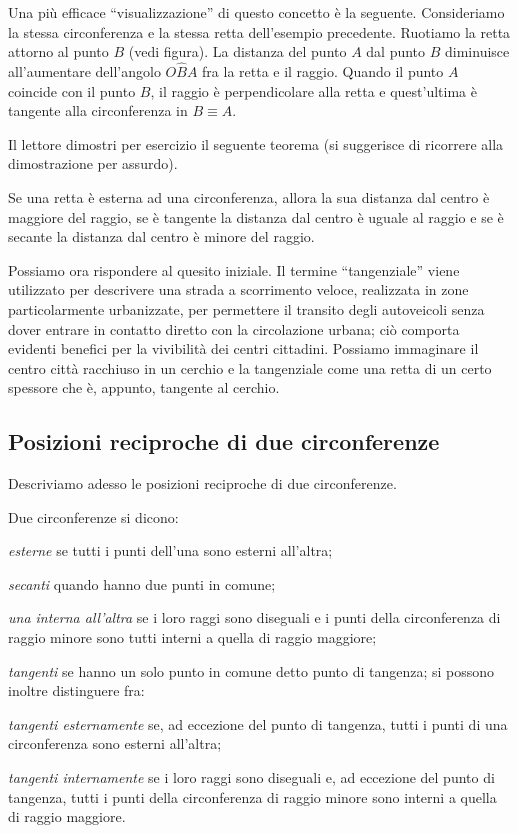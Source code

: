 Una più efficace ``visualizzazione'' di questo concetto è la seguente.
Consideriamo la stessa circonferenza e la stessa retta dell'esempio precedente. Ruotiamo la retta attorno al punto $B$ (vedi figura).
La distanza del punto $A$ dal punto $B$ diminuisce all'aumentare dell'angolo $O\widehat{B}A$ fra la retta e il raggio. Quando il punto $A$ coincide con il punto $B$, il raggio è perpendicolare alla retta e quest'ultima è tangente alla circonferenza in $B\equiv A$.

Il lettore dimostri per esercizio il seguente teorema (si suggerisce di ricorrere alla dimostrazione per assurdo).
\begin{teorema}
Se una retta è esterna ad una circonferenza, allora la sua distanza dal centro è maggiore del raggio, se è tangente la distanza dal centro è uguale al raggio e se è secante la distanza dal centro è minore del raggio.
\end{teorema}

Possiamo ora rispondere al quesito iniziale. Il termine ``tangenziale'' viene utilizzato per descrivere una strada a scorrimento veloce, realizzata in zone particolarmente urbanizzate, per permettere il transito degli autoveicoli senza dover entrare in contatto diretto con la circolazione urbana; ciò comporta evidenti benefici per la vivibilità dei centri cittadini. Possiamo immaginare il centro città racchiuso in un cerchio e la tangenziale come una retta di un certo spessore che è, appunto, tangente al cerchio.

\subsection{Posizioni reciproche di due circonferenze}

Descriviamo adesso le posizioni reciproche di due circonferenze.
\begin{definizione}
Due circonferenze si dicono:
\begin{itemize*}
\item \emph{esterne} se tutti i punti dell'una sono esterni all'altra;
\item \emph{secanti} quando hanno due punti in comune;
\item \emph{una interna all'altra} se i loro raggi sono diseguali e i punti della circonferenza di raggio minore sono tutti interni a quella di raggio maggiore;
\item \emph{tangenti} se hanno un solo punto in comune detto punto di tangenza; si possono inoltre distinguere fra: 
\begin{itemize*}
\item \emph{tangenti esternamente} se, ad eccezione del punto di tangenza, tutti i punti di una circonferenza sono esterni all'altra;
\item \emph{tangenti internamente} se i loro raggi sono diseguali e, ad eccezione del punto di tangenza, tutti i punti della circonferenza di raggio minore sono interni a quella di raggio maggiore.
\end{itemize*}
\end{itemize*}
\end{definizione}

